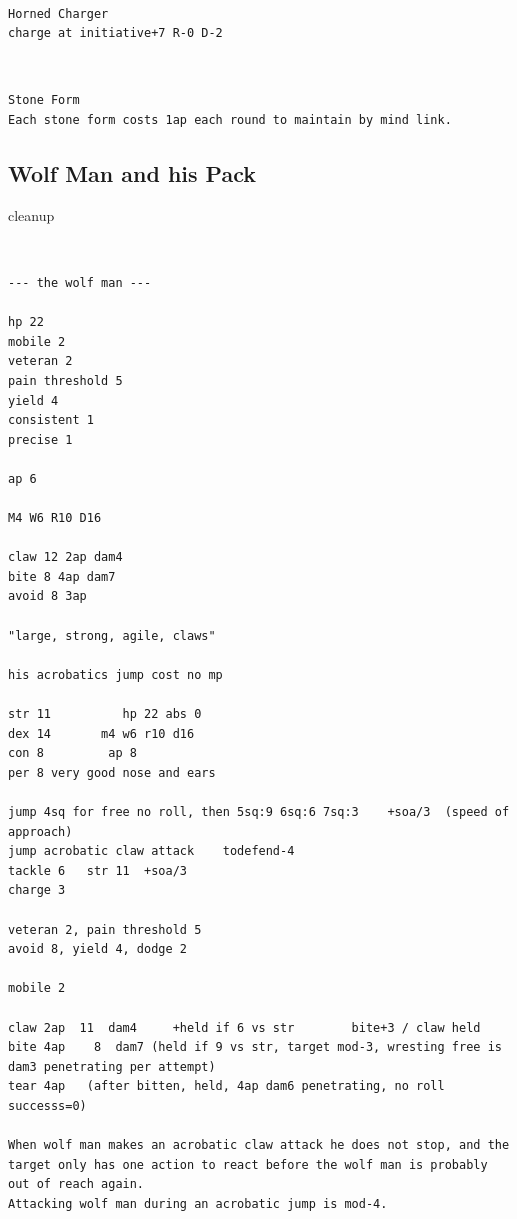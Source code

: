 \

\goodbreak
\begin{samepage}
\small \begin{verbatim}
Horned Charger
charge at initiative+7 R-0 D-2
\end{verbatim} \normalsize
\end{samepage}

\

\goodbreak
\begin{samepage}
\small \begin{verbatim}
Stone Form
Each stone form costs 1ap each round to maintain by mind link.
\end{verbatim} \normalsize
\end{samepage}






\goodbreak
{}
\subsection*{Wolf Man and his Pack}
\label{sec:wolfmanstats}

\todo cleanup

\

\begin{samepage}
\small \begin{verbatim}
--- the wolf man ---

hp 22
mobile 2
veteran 2
pain threshold 5
yield 4
consistent 1
precise 1

ap 6

M4 W6 R10 D16

claw 12 2ap dam4
bite 8 4ap dam7
avoid 8 3ap

"large, strong, agile, claws"

his acrobatics jump cost no mp

str 11          hp 22 abs 0
dex 14       m4 w6 r10 d16
con 8         ap 8
per 8 very good nose and ears

jump 4sq for free no roll, then 5sq:9 6sq:6 7sq:3    +soa/3  (speed of approach)
jump acrobatic claw attack    todefend-4
tackle 6   str 11  +soa/3
charge 3

veteran 2, pain threshold 5
avoid 8, yield 4, dodge 2

mobile 2

claw 2ap  11  dam4     +held if 6 vs str        bite+3 / claw held
bite 4ap    8  dam7 (held if 9 vs str, target mod-3, wresting free is dam3 penetrating per attempt)
tear 4ap   (after bitten, held, 4ap dam6 penetrating, no roll successs=0)

When wolf man makes an acrobatic claw attack he does not stop, and the target only has one action to react before the wolf man is probably out of reach again.
Attacking wolf man during an acrobatic jump is mod-4.
\end{verbatim} \normalsize
\end{samepage}

